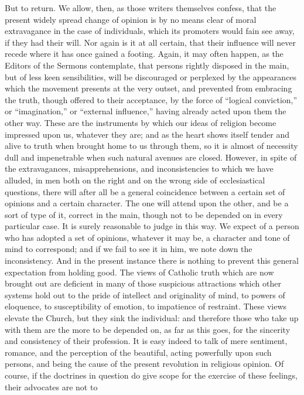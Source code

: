 But to return. We allow, then, as those writers
themselves confess, that the present widely spread change of opinion
is by no means clear of moral extravagance in the case of individuals,
which its promoters would fain see away, if they had their will. Nor
again is it at all certain, that their influence will never recede
where it has once gained a footing. Again, it may often happen, as the
Editors of the Sermons contemplate, that persons rightly disposed in
the main, but of less keen sensibilities, will be discouraged or
perplexed by the appearances which the movement presents at the very
outset, and prevented from embracing the truth, though offered to
their acceptance, by the force of ``logical conviction,'' or ``imagination,''
or ``external influence,'' having already acted upon them the
other way. These are the instruments by which our ideas of religion
become impressed upon us, whatever they are; and as the heart shows
itself tender and alive to truth when brought home to us through them,
so it is almost of necessity dull and impenetrable when such natural
avenues are closed. However, in spite of the extravagances,
misapprehensions, and inconsistencies to which we have alluded, in men
both on the right and on the wrong side of ecclesiastical questions,
there will after all be a general coincidence between a certain set of
opinions and a certain character. The one will attend upon the other,
and be a sort of type of it, correct in the main, though not to be
depended on in every particular case. It is surely reasonable to judge
in this way. We expect of a person who has adopted a set of opinions,
whatever it may be, a character and tone of mind to correspond; and if
we fail to see it in him, we note down the inconsistency. And in the
present instance there is nothing to prevent this general expectation
from holding good. The views of Catholic truth which are now brought
out are deficient in many of those suspicious attractions which other
systems hold out to the pride of intellect and originality of mind, to
powers of eloquence, to susceptibility of emotion, to impatience of
restraint. These views elevate the Church, but they sink the
individual: and therefore those who take up with them are the more to
be depended on, as far as this goes, for the sincerity and consistency
of their profession. It is easy indeed to talk of mere sentiment,
romance, and the perception of the beautiful, acting powerfully upon
such persons, and being the cause of the present revolution in
religious opinion. Of course, if the doctrines in question do give
scope for the exercise of these feelings, their advocates are not to
